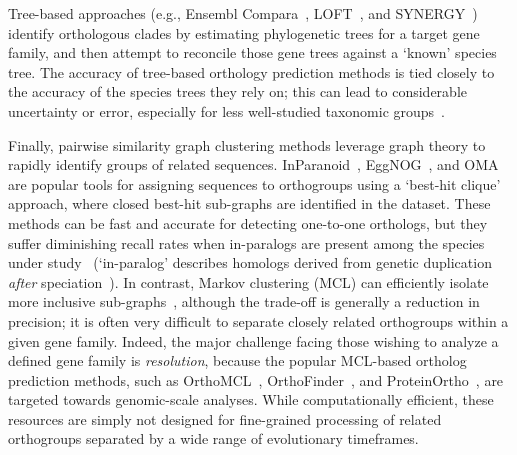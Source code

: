 \documentclass[twocolumn]{bmcart}%
\begin{document}
Tree-based approaches (e.g., Ensembl Compara~\cite{Vilella:2009ju}, LOFT~\cite{vanderHeijden:2007bo}, and SYNERGY~\cite{Wapinski:2007fa}) identify orthologous clades by estimating phylogenetic trees for a target gene family, and then attempt to reconcile those gene trees against a `known' species tree.
The accuracy of tree-based orthology prediction methods is tied closely to the accuracy of the species trees they rely on;
this can lead to considerable uncertainty or error, especially for less well-studied taxonomic groups~\cite{Xu:2016ek}.

Finally, pairwise similarity graph clustering methods leverage graph theory to rapidly identify groups of related sequences.
InParanoid~\cite{OBrien:2005cy}, EggNOG~\cite{Jensen:2007cc}, and OMA~\cite{Roth:2009iu} are popular tools for assigning sequences to orthogroups using a `best-hit clique' approach, where closed best-hit sub-graphs are identified in the dataset.
These methods can be fast and accurate for detecting one-to-one orthologs, but they suffer diminishing recall rates when in-paralogs are present among the species under study~\cite{Dalquen:2013fz} (`in-paralog' describes homologs derived from genetic duplication \textit{after} speciation~\cite{Sonnhammer:2002vm,Tekaia:2016ga}).
In contrast, Markov clustering (MCL) can efficiently isolate more inclusive sub-graphs~\cite{VanDongen:kJZ890qx,Enright:2002uq}, although the trade-off is generally a reduction in precision;
it is often very difficult to separate closely related orthogroups within a given gene family.
Indeed, the major challenge facing those wishing to analyze a defined gene family is \textit{resolution}, because the popular MCL-based ortholog prediction methods, such as OrthoMCL~\cite{Li:2003en}, OrthoFinder~\cite{Emms:2015ig}, and ProteinOrtho~\cite{Lechner:2011jk}, are targeted towards genomic-scale analyses.
While computationally efficient, these resources are simply not designed for fine-grained processing of related orthogroups separated by a wide range of evolutionary timeframes.
\end{document}
